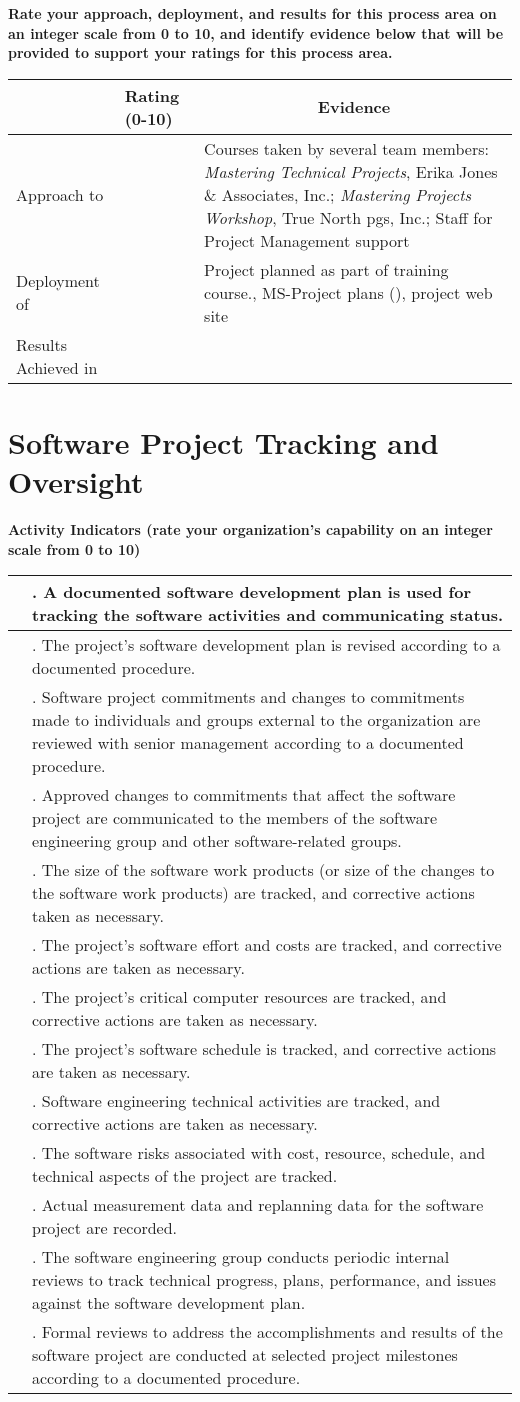 \documentclass{article}
\newcommand{\KPAname}{}
\let\KPAsection=\section
\renewcommand{\section}[1]{\renewcommand{\KPAname}{#1}\KPAsection{#1}}
\newcounter{activity}[section]		%
\newcounter{approach}[section]
\newcounter{deployment}[section]
\newcounter{result}[section]
\newcounter{score}
\newenvironment{KPAActivity}
{
    {\bf Activity Indicators (rate your organization's capability
    on an integer scale from 0 to 10)} %
    \begin{center}
    \begin{tabular}{|p{0.5in}|p{6.0in}|} \hline %
}
{
    \end{tabular}
    \end{center}
    \setcounter{approach}{\value{approach}/\value{activity}}
    \setcounter{deployment}{\value{deployment}/\value{activity}}
    \setcounter{result}{\value{result}/\value{activity}}
}
\newcommand{\Activity}[4]
{
    \stepcounter{activity} 
    \setcounter{score}{(#1+#2+#3)/3}
    \setcounter{approach}{\value{approach}+#1}
    \setcounter{deployment}{\value{deployment}+#1}
    \setcounter{result}{\value{result}+#1}
    \arabic{score} & \arabic{activity}. #4 \\ \hline
} %
\newenvironment{KPARate}
{
    {\bf Rate your approach, deployment, and results for
    this process area on an integer scale from 0 to 10, and 
    identify evidence below that will be provided to support your
    ratings for this process area.}
    \begin{center}
    \begin{tabular}{|p{1.0in}|p{0.5in}|p{5.0in}|} \hline
    & Rating (0-10) & \multicolumn{1}{c|}{Evidence} \\ \hline
}
{
    \end{tabular}
    \end{center}
}
\newcommand{\Approach}[1]
{
    Approach to \KPAname & \arabic{approach} & #1 \\ \hline
}
\newcommand{\Deployment}[1]
{
    Deployment of \KPAname & \arabic{deployment} & #1 \\ \hline
}
\newcommand{\Results}[1]
{
    Results Achieved in \KPAname & \arabic{result} & #1 \\ \hline
}
\begin{document}
\begin{KPARate}
\Approach{Courses taken by several team members: 
             {\em Mastering Technical Projects}, Erika Jones \&
             Associates, Inc.;  
             {\em Mastering Projects Workshop}, True North pgs, Inc.;
             Staff for Project Management support}
\Deployment{Project planned as part of training course., MS-Project
             plans (), project web site}
\Results{}
\end{KPARate}

\newpage
\section{Software Project Tracking and Oversight}

\begin{KPAActivity}
\Activity{3}{3}{3}{A documented software development plan is used for
tracking the software activities and communicating status.}
\Activity{1}{1}{1}{The project's software development plan is revised
according to a documented procedure.}
\Activity{1}{1}{1}{Software project commitments and changes to
commitments made to individuals and groups external to the
organization are reviewed with senior management according to a
documented procedure.}
\Activity{3}{3}{3}{Approved changes to commitments that affect the
software project are communicated to the members of the software
engineering group and other software-related groups.}
\Activity{0}{0}{0}{The size of the software work products (or size of the
changes to the software work products) are tracked, and corrective
actions taken as necessary.}
\Activity{3}{3}{3}{The project's software effort and costs are tracked,
and corrective actions are taken as necessary.}
\Activity{3}{3}{3}{The project's critical computer resources are tracked,
and corrective actions are taken as necessary.}
\Activity{3}{3}{3}{The project's software schedule is tracked, and
corrective actions are taken as necessary.}
\Activity{3}{3}{3}{Software engineering technical activities are tracked,
and corrective actions are taken as necessary.}
\Activity{1}{1}{1}{The software risks associated with cost, resource,
schedule, and technical aspects of the project are tracked.}
\Activity{1}{1}{1}{Actual measurement data and replanning data for the
software project are recorded.}
\Activity{2}{2}{2}{The software engineering group conducts periodic
internal reviews to track technical progress, plans, performance, and
issues against the software development plan.}
\Activity{2}{2}{2}{Formal reviews to address the accomplishments and
results of the software project are conducted at selected project
milestones according to a documented procedure.} 
\end{KPAActivity}
\end{document}
